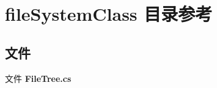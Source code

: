 \section{file\+System\+Class 目录参考}
\label{dir_8a59cb26de0070a567ae1842c66017dd}
\subsection*{文件}
\begin{DoxyCompactItemize}
\item 
文件 \textbf{ File\+Tree.\+cs}
\end{DoxyCompactItemize}
